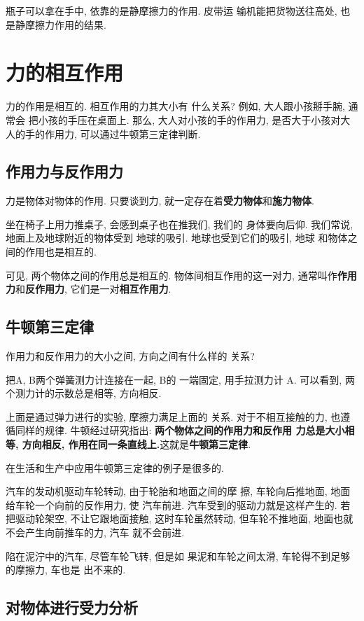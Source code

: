 \documentclass[11pt,a4paper]{ctexbook}
\begin{document}
瓶子可以拿在手中, 依靠的是静摩擦力的作用. 皮带运
输机能把货物送往高处, 也是静摩擦力作用的结果.

\section{力的相互作用}

力的作用是相互的. 相互作用的力其大小有
什么关系? 例如, 大人跟小孩掰手腕, 通常会
把小孩的手压在桌面上. 那么, 大人对小孩的手的作用力,
是否大于小孩对大人的手的作用力, 可以通过牛顿第三定律判断.

\subsection{作用力与反作用力}
力是物体对物体的作用. 只要谈到力, 就一定存在着\textbf{受力物体}和\textbf{施力物体}.

坐在椅子上用力推桌子, 会感到桌子也在推我们, 我们的
身体要向后仰. 我们常说, 地面上及地球附近的物体受到
地球的吸引. 地球也受到它们的吸引, 地球
和物体之间的作用也是相互的.

可见, 两个物体之间的作用总是相互的. 物体间相互作用的这一对力,
通常叫作\textbf{作用力}和\textbf{反作用力}, 它们是一对\textbf{相互作用力}.

\subsection{牛顿第三定律}

作用力和反作用力的大小之间, 方向之间有什么样的
关系?

把A, B两个弹簧测力计连接在一起, B的
一端固定, 用手拉测力计 A. 可以看到,
两个测力计的示数总是相等, 方向相反.

上面是通过弹力进行的实验, 摩擦力满足上面的
关系. 对于不相互接触的力, 也遵循同样的规律. 牛顿经过研究指出: \textbf{两个物体之间的作用力和反作用
力总是大小相等, 方向相反, 作用在同一条直线上.}这就是\textbf{牛顿第三定律}.

在生活和生产中应用牛顿第三定律的例子是很多的.

汽车的发动机驱动车轮转动, 由于轮胎和地面之间的摩
擦, 车轮向后推地面, 地面给车轮一个向前的反作用力, 使
汽车前进. 汽车受到的驱动力就是这样产生的.
若把驱动轮架空, 不让它跟地面接触, 这时车轮虽然转动,
但车轮不推地面, 地面也就不会产生向前推车的力, 汽车
就不会前进.

陷在泥泞中的汽车, 尽管车轮飞转, 但是如
果泥和车轮之间太滑, 车轮得不到足够的摩擦力, 车也是
出不来的.

\subsection{对物体进行受力分析}
\label{斜面物块问题}
\end{document}

